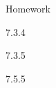 \begin{frame}{Homework}
  \begin{center}

      7.3.4

    \vspace{2em}

    7.3.5

    \vspace{2em}

    7.5.5

  \end{center}
\end{frame}








